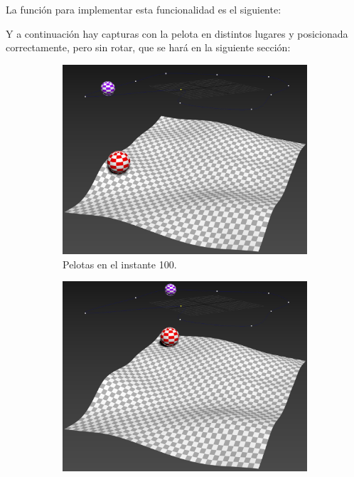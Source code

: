 La función para implementar esta funcionalidad es el siguiente:



\bigskip

Y a continuación hay capturas con la pelota en distintos lugares y posicionada correctamente, pero sin rotar, que se hará en la siguiente sección:


\begin{figure}[H]
    \centering 
	\begin{subfigure}[t]{0.48\textwidth}
	    \centering
	    \includegraphics[width=\textwidth]{imagenes/posicion/100.jpg}
        \caption{Pelotas en el instante 100.}
    \end{subfigure}
    \hfill 
	\begin{subfigure}[t]{0.48\textwidth}
	    \centering
	    \includegraphics[width=\textwidth]{imagenes/posicion/185.jpg}

\end{subfigure}
\end{figure}
